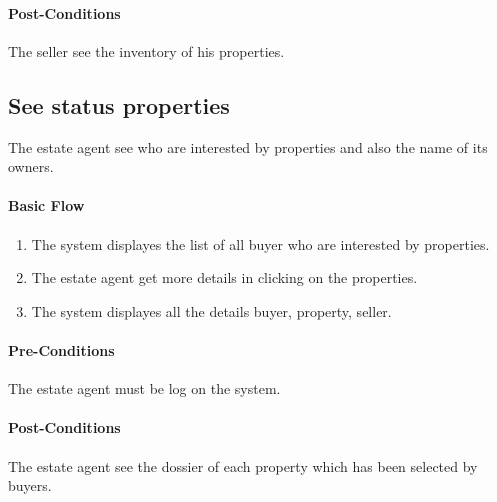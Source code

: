 \documentclass[a4paper,12pt]{article}
\begin{document}
\paragraph{Post-Conditions}
The seller see the inventory of his properties.

\subsection{See status properties}
The estate agent see who are interested by properties and also the name of its owners.
\paragraph{Basic Flow}
\begin{enumerate}
\item The system displayes the list of all buyer who are interested by properties.
\item The estate agent get more details in clicking on the properties.
\item The system displayes all the details buyer, property, seller.
\end{enumerate}
\paragraph{Pre-Conditions}
The estate agent must be log on the system.
\paragraph{Post-Conditions}
The estate agent see the dossier of each property which has been selected by buyers.
\end{document}
